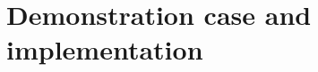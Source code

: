 \section{Demonstration case and implementation}





%         
     
%         
     
     
     
     
     



